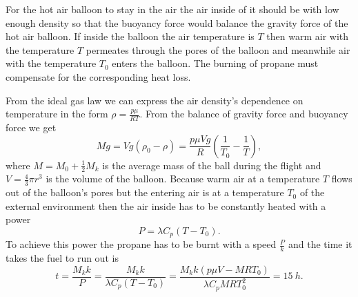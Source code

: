 {\ifEngHint
For the hot air balloon to stay in the air the air inside of it should be with low enough density so that the buoyancy force would balance the gravity force of the hot air balloon. If inside the balloon the air temperature is $T$ then warm air with the temperature $T$ permeates through the pores of the balloon and meanwhile air with the temperature $T_0$ enters the balloon. The burning of propane must compensate for the corresponding heat loss.
\fi


\ifEngSolution
From the ideal gas law we can express the air density’s dependence on temperature in the form $\rho = \frac{p \mu}{R T}$. From the balance of gravity force and buoyancy force we get
\[
M g = V g (\rho_0 - \rho) = \frac{p \mu V g}{R} (\frac{1}{T_0} - \frac{1}{T}),
\] 
where $M = M_0 + \frac{1}{2} M_k$ is the average mass of the ball during the flight and $V = \frac{4}{3} \pi r^3$ is the volume of the balloon. Because warm air at a temperature $T$ flows out of the balloon’s pores but the entering air is at a temperature $T_0$ of the external environment then the air inside has to be constantly heated with a power
\[
P = \lambda C_p (T - T_0).
\] 
To achieve this power the propane has to be burnt with a speed $\frac{P}{k}$ and the time it takes the fuel to run out is
\[
t = \frac{M_k k}{P} = \frac{M_k k}{\lambda C_p (T - T_0)} = \frac{M_k k (p \mu V - M R T_0)}{\lambda C_p M R T_0^2} = \SI{15}{h}.
\]
\fi
}